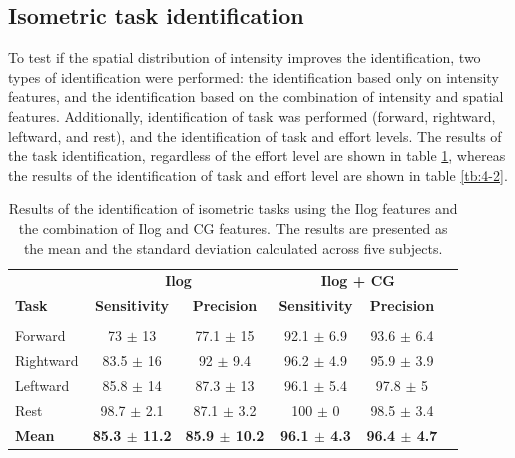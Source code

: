 \subsection{Isometric task identification}
To test if the spatial distribution of intensity improves the identification, two types of identification were performed: the identification based only on intensity features, and the identification based on the combination of intensity and spatial features. Additionally, identification of task was performed (forward, rightward, leftward, and rest), and the identification of task and effort levels. The results of the task identification, regardless of the effort level are shown in table \ref{tb:4-1}, whereas the results of the identification of task and effort level are shown in table \ref{tb:4-2}.

\begin{table}[h!]
\centering
\caption{Results of the identification of isometric tasks using the Ilog features and the combination of Ilog and CG features. The results are presented as the mean and the standard deviation calculated across five subjects.}
\label{tb:4-1}
\begin{tabular}{lccccc}
 
              & \multicolumn{2}{c}{\textbf{Ilog}}                            & \multicolumn{2}{c}{\textbf{Ilog + CG}}                       \\
\textbf{Task} & \textbf{Sensitivity}     & \textbf{Precision}       & \textbf{Sensitivity}     & \textbf{Precision}       \\ \hline
                         &                                           &          &          &                   \\
Forward       & 73 $\pm$ 13              & 77.1 $\pm$ 15            & 92.1 $\pm$ 6.9           & 93.6 $\pm$ 6.4           \\
Rightward     & 83.5 $\pm$ 16            & 92 $\pm$ 9.4             & 96.2 $\pm$ 4.9           & 95.9 $\pm$ 3.9           \\
Leftward      & 85.8 $\pm$ 14            & 87.3 $\pm$ 13            & 96.1 $\pm$ 5.4           & 97.8 $\pm$ 5             \\
Rest          & 98.7 $\pm$ 2.1           & 87.1 $\pm$ 3.2           & 100 $\pm$ 0              & 98.5 $\pm$ 3.4           \\ 
\textbf{Mean} & \textbf{85.3 $\pm$ 11.2} & \textbf{85.9 $\pm$ 10.2} & \textbf{96.1 $\pm$  4.3} & \textbf{96.4  $\pm$ 4.7}
\end{tabular}
\end{table}

